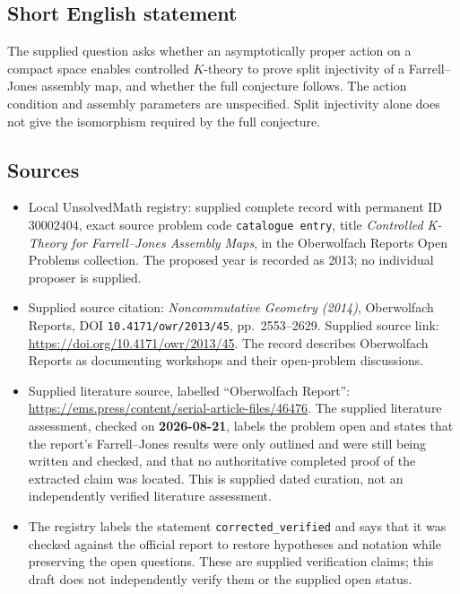 \documentclass[11pt]{article}
\begin{document}
\subsection{Short English statement}
The supplied question asks whether an asymptotically proper action on a compact space enables controlled \(K\)-theory to prove split injectivity of a Farrell--Jones assembly map, and whether the full conjecture follows. The action condition and assembly parameters are unspecified. Split injectivity alone does not give the isomorphism required by the full conjecture.
\subsection{Sources}
\begin{itemize}
\item Local UnsolvedMath registry: supplied complete record with permanent ID \(30002404\), exact source problem code \texttt{catalogue entry}, title \emph{Controlled K-Theory for Farrell--Jones Assembly Maps}, in the Oberwolfach Reports Open Problems collection. The proposed year is recorded as 2013; no individual proposer is supplied.
\item Supplied source citation: \emph{Noncommutative Geometry (2014)}, Oberwolfach Reports, DOI \texttt{10.4171/owr/2013/45}, pp.~2553--2629. Supplied source link: \url{https://doi.org/10.4171/owr/2013/45}. The record describes Oberwolfach Reports as documenting workshops and their open-problem discussions.
\item Supplied literature source, labelled ``Oberwolfach Report'': \url{https://ems.press/content/serial-article-files/46476}. The supplied literature assessment, checked on \textbf{2026-08-21}, labels the problem open and states that the report's Farrell--Jones results were only outlined and were still being written and checked, and that no authoritative completed proof of the extracted claim was located. This is supplied dated curation, not an independently verified literature assessment.
\item The registry labels the statement \texttt{corrected\_verified} and says that it was checked against the official report to restore hypotheses and notation while preserving the open questions. These are supplied verification claims; this draft does not independently verify them or the supplied open status.
\end{itemize}
\end{document}
